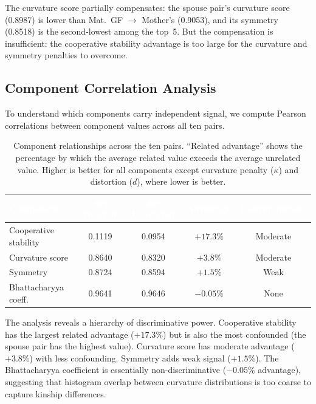\documentclass{../yalumba}
\begin{document}
The curvature score partially compensates: the spouse pair's curvature
score (0.8987) is lower than Mat.~GF $\to$ Mother's (0.9053), and its
symmetry (0.8518) is the second-lowest among the top~5.  But the
compensation is insufficient: the cooperative stability advantage is too
large for the curvature and symmetry penalties to overcome.

\subsection{Component Correlation Analysis}

To understand which components carry independent signal, we compute
Pearson correlations between component values across all ten pairs.

\begin{table}[htbp]
\centering
\tablestyle
\caption{Component relationships across the ten pairs.  ``Related
advantage'' shows the percentage by which the average related value
exceeds the average unrelated value.  Higher is better for all
components except curvature penalty ($\kappa$) and distortion ($d$),
where lower is better.}
\label{tab:components}
\begin{tabular}{@{}lcccc@{}}
\toprule
\rowcolor{table-header}
\textcolor{white}{\textbf{Component}} &
\textcolor{white}{\textbf{Avg Related}} &
\textcolor{white}{\textbf{Avg Unrelated}} &
\textcolor{white}{\textbf{Advantage}} &
\textcolor{white}{\textbf{Discriminative?}} \\
\midrule
Cooperative stability & 0.1119 & 0.0954 & $+17.3\%$ & Moderate \\
Curvature score       & 0.8640 & 0.8320 & $+3.8\%$  & Moderate \\
Symmetry              & 0.8724 & 0.8594 & $+1.5\%$  & Weak \\
Bhattacharyya coeff.  & 0.9641 & 0.9646 & $-0.05\%$ & None \\
\bottomrule
\end{tabular}
\end{table}

The analysis reveals a hierarchy of discriminative power.  Cooperative
stability has the largest related advantage ($+17.3\%$) but is also the
most confounded (the spouse pair has the highest value).  Curvature score
has moderate advantage ($+3.8\%$) with less confounding.  Symmetry adds
weak signal ($+1.5\%$).  The Bhattacharyya coefficient is essentially
non-discriminative ($-0.05\%$ advantage), suggesting that histogram
overlap between curvature distributions is too coarse to capture kinship
differences.
\end{document}
